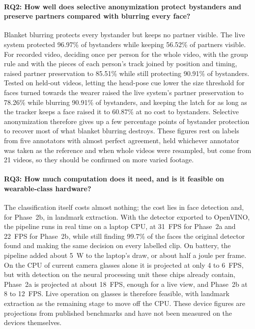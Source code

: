 \paragraph{RQ2: How well does selective anonymization protect bystanders and preserve
partners compared with blurring every face?}
Blanket blurring protects every bystander but keeps no partner visible. The live system
protected 96.97\% of bystanders while keeping 56.52\% of partners visible. For recorded
video, deciding once per person for the whole video, with the group rule and with the
pieces of each person's track joined by position and timing, raised partner preservation
to 85.51\% while still protecting 90.91\% of bystanders. Tested on held-out videos, letting the head-pose cue
lower the size threshold for faces turned towards the wearer raised the live system's
partner preservation to 78.26\% while blurring 90.91\% of bystanders, and keeping the
latch for as long as the tracker keeps a face raised it to 60.87\% at no cost to
bystanders. Selective anonymization therefore gives up a few
percentage points of bystander protection to recover most of what blanket blurring
destroys. These figures rest on labels from five annotators with almost perfect agreement,
held whichever annotator was taken as the reference and when whole videos were resampled,
but come from 21 videos, so they should be confirmed on more varied footage.

\paragraph{RQ3: How much computation does it need, and is it feasible on wearable-class
hardware?}
The classification itself costs almost nothing; the cost lies in face detection and,
for Phase~2b, in landmark extraction. With the detector exported to OpenVINO, the pipeline
runs in real time on a laptop CPU, at 31~FPS for Phase~2a and 22~FPS for Phase~2b, while
still finding 99.7\% of the faces the original detector found and making the same decision
on every labelled clip. On battery, the pipeline added about 5~W to the laptop's draw, or
about half a joule per frame. On the CPU of current
camera glasses alone it is projected at only 4 to 6~FPS, but with detection on the neural
processing unit these chips already contain, Phase~2a is projected at about 18~FPS, enough
for a live view, and Phase~2b at 8 to 12~FPS. Live operation on glasses is therefore
feasible, with landmark extraction as the remaining stage to move off the CPU. These device
figures are projections from published benchmarks and have not been measured on the
devices themselves.

